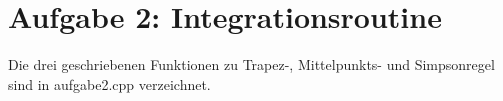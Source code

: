 \newpage
\section{Aufgabe 2: Integrationsroutine}
\label{sec:auf2}

Die drei geschriebenen Funktionen zu Trapez-, Mittelpunkts- und Simpsonregel sind in aufgabe2.cpp verzeichnet.